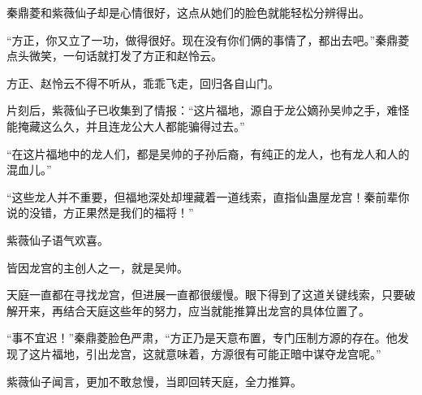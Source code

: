 \begin{this_body}
秦鼎菱和紫薇仙子却是心情很好，这点从她们的脸色就能轻松分辨得出。

“方正，你又立了一功，做得很好。现在没有你们俩的事情了，都出去吧。”秦鼎菱点头微笑，一句话就打发了方正和赵怜云。

方正、赵怜云不得不听从，乖乖飞走，回归各自山门。

片刻后，紫薇仙子已收集到了情报：“这片福地，源自于龙公嫡孙吴帅之手，难怪能掩藏这么久，并且连龙公大人都能骗得过去。”

“在这片福地中的龙人们，都是吴帅的子孙后裔，有纯正的龙人，也有龙人和人的混血儿。”

“这些龙人并不重要，但福地深处却埋藏着一道线索，直指仙蛊屋龙宫！秦前辈你说的没错，方正果然是我们的福将！”

紫薇仙子语气欢喜。

皆因龙宫的主创人之一，就是吴帅。

天庭一直都在寻找龙宫，但进展一直都很缓慢。眼下得到了这道关键线索，只要破解开来，再结合天庭这些年的努力，应当就能推算出龙宫的具体位置了。

“事不宜迟！”秦鼎菱脸色严肃，“方正乃是天意布置，专门压制方源的存在。他发现了这片福地，引出龙宫，这就意味着，方源很有可能正暗中谋夺龙宫呢。”

紫薇仙子闻言，更加不敢怠慢，当即回转天庭，全力推算。

\end{this_body}


